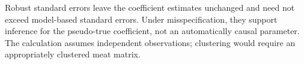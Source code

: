 \documentclass[answers,12pt,addpoints]{exam}
\begin{document}
\begin{questions}
\begin{solution}
Robust standard errors leave the coefficient estimates unchanged and need
not exceed model-based standard errors. Under misspecification, they support
inference for the pseudo-true coefficient, not an automatically causal
parameter. The calculation assumes independent observations; clustering
would require an appropriately clustered meat matrix.
\end{solution}

\end{questions}
\end{document}
